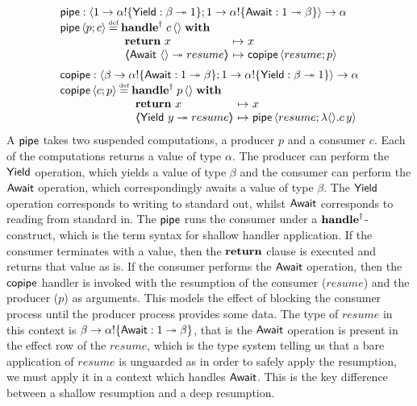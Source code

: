 \documentclass[12pt,phd,lfcs,twoside,openright,logo,leftchapter,normalheadings]{infthesis}
\theoremstyle{plain}
\theoremstyle{definition}
\begin{document}
\[
\bl
   \Pipe   : \Record{\UnitType \to \alpha \eff \{ \Yield : \beta \opto \UnitType \}; \UnitType \to \alpha\eff\{ \Await : \UnitType \opto \beta \}}          \to \alpha \\
   \Pipe\, \Record{p; c} \defas
        \bl
          \ShallowHandle\; c\,\Unit \;\With\; \\
           ~\ba[m]{@{}l@{~}c@{~}l@{}}
              \Return~x &\mapsto& x \\
              \OpCase{\Await}{\Unit}{resume}  &\mapsto& \Copipe\,\Record{resume; p} \\
            \ea
        \el\medskip\\

   \Copipe : \Record{\beta \to \alpha\eff\{ \Await : \UnitType \opto \beta\};    \UnitType \to \alpha\eff\{ \Yield : \beta \opto \UnitType\}} \to \alpha \\
   \Copipe\, \Record{c; p} \defas
      \bl
         \ShallowHandle\; p\,\Unit \;\With\; \\
          ~\ba[m]{@{}l@{~}c@{~}l@{}}
             \Return~x &\mapsto& x \\
             \OpCase{\Yield}{y}{resume} &\mapsto& \Pipe\,\Record{resume; \lambda \Unit. c\, y} \\
           \ea \\
      \el \\
\el
\]
%
A $\mathsf{pipe}$ takes two suspended computations, a producer $p$ and a
consumer $c$.
%
Each of the computations returns a value of type $\alpha$.
%
The producer can perform the $\mathsf{Yield}$ operation, which yields a value
of type $\beta$ and the consumer can perform the $\mathsf{Await}$ operation,
which correspondingly awaits a value of type $\beta$. The $\mathsf{Yield}$
operation corresponds to writing to standard out, whilst $\mathsf{Await}$
corresponds to reading from standard in.
%
The $\mathsf{pipe}$ runs the consumer under a $\mathbf{handle}^\dagger$-construct,
which is the term syntax for shallow handler application. If the
consumer terminates with a value, then the $\mathbf{return}$ clause is
executed and returns that value as is. If the consumer performs the
$\mathsf{Await}$ operation, then the $\mathsf{copipe}$ handler is invoked with the
resumption of the consumer ($resume$) and the producer ($p$) as
arguments. This models the effect of blocking the consumer process
until the producer process provides some data. The type of $resume$ in
this context is
$\beta \to \alpha !\{\mathsf{Await} : 1 \twoheadrightarrow \beta\}$, that is the
$\mathsf{Await}$ operation is present in the effect row of the $resume$, which
is the type system telling us that a bare application of $resume$ is
unguarded as in order to safely apply the resumption, we must apply it
in a context which handles $\mathsf{Await}$. This is the key difference
between a shallow resumption and a deep resumption.
\end{document}
